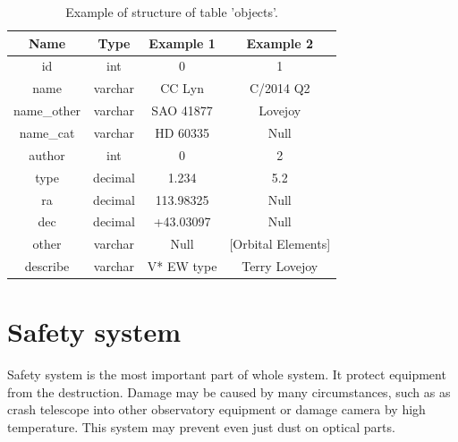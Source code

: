 \documentclass{ibws_template}
\begin{document}
\begin{table}[h]
\begin{center}
{\renewcommand{\arraystretch}{1.8}
\tablefont
\begin{tabular}{|c|c|c|c|}
\hline
Name
&Type
&Example 1
&Example 2\\
\hline
\hline
id
&int
&0
&1\\
\hline
name
&varchar
&CC Lyn
&C/2014 Q2\\
\hline
name\_other
&varchar
&SAO 41877
&Lovejoy\\
\hline
name\_cat
&varchar
&HD 60335
&Null\\
\hline
author
&int
&0
&2\\
\hline
type
&decimal
&1.234
&5.2\\
\hline
ra
&decimal
&113.98325
&Null\\
\hline
dec
&decimal
&+43.03097
&Null\\
\hline
other
&varchar
&Null
&[Orbital Elements]\\
\hline
describe
&varchar
&V* EW type
&Terry Lovejoy\\
\hline
\end{tabular}}
\caption{Example of structure of table 'objects'.}
\label{tab}
\end{center}
\end{table}
\vspace{11cm}

%

\section{Safety system}
Safety system is the most important part of whole system. It protect equipment from the destruction. Damage may be caused by many circumstances, such as as crash telescope into other observatory equipment or damage camera by high temperature. This system may prevent even just dust on optical parts. 
\end{document}
